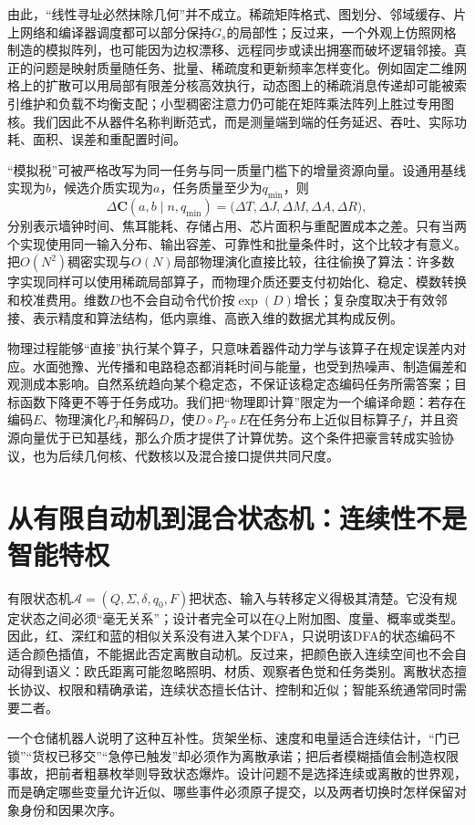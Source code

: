 由此，“线性寻址必然抹除几何”并不成立。稀疏矩阵格式、图划分、邻域缓存、片上网络和编译器调度都可以部分保持$G_s$的局部性；反过来，一个外观上仿照网格制造的模拟阵列，也可能因为边权漂移、远程同步或读出拥塞而破坏逻辑邻接。真正的问题是映射质量随任务、批量、稀疏度和更新频率怎样变化。例如固定二维网格上的扩散可以用局部有限差分核高效执行，动态图上的稀疏消息传递却可能被索引维护和负载不均衡支配；小型稠密注意力仍可能在矩阵乘法阵列上胜过专用图核。我们因此不从器件名称判断范式，而是测量端到端的任务延迟、吞吐、实际功耗、面积、误差和重配置时间。

“模拟税”可被严格改写为同一任务与同一质量门槛下的增量资源向量。设通用基线实现为$b$，候选介质实现为$a$，任务质量至少为$q_{\min}$，则
\[
\Delta\mathbf C(a,b\mid n,q_{\min})=
\bigl(\Delta T,\Delta J,\Delta M,\Delta A,\Delta R\bigr),
\]
分别表示墙钟时间、焦耳能耗、存储占用、芯片面积与重配置成本之差。只有当两个实现使用同一输入分布、输出容差、可靠性和批量条件时，这个比较才有意义。把$O(N^2)$稠密实现与$O(N)$局部物理演化直接比较，往往偷换了算法：许多数字实现同样可以使用稀疏局部算子，而物理介质还要支付初始化、稳定、模数转换和校准费用。维数$D$也不会自动令代价按$\exp(D)$增长；复杂度取决于有效邻接、表示精度和算法结构，低内禀维、高嵌入维的数据尤其构成反例。

物理过程能够“直接”执行某个算子，只意味着器件动力学与该算子在规定误差内对应。水面弛豫、光传播和电路稳态都消耗时间与能量，也受到热噪声、制造偏差和观测成本影响。自然系统趋向某个稳定态，不保证该稳定态编码任务所需答案；目标函数下降更不等于任务成功。我们把“物理即计算”限定为一个编译命题：若存在编码$E$、物理演化$P_T$和解码$D$，使$D\circ P_T\circ E$在任务分布上近似目标算子$f$，并且资源向量优于已知基线，那么介质才提供了计算优势。这个条件把豪言转成实验协议，也为后续几何核、代数核以及混合接口提供共同尺度。

\section{从有限自动机到混合状态机：连续性不是智能特权}
\label{sec:automata_sublimation}

有限状态机$\mathcal A=(Q,\Sigma,\delta,q_0,F)$把状态、输入与转移定义得极其清楚。它没有规定状态之间必须“毫无关系”；设计者完全可以在$Q$上附加图、度量、概率或类型。因此，红、深红和蓝的相似关系没有进入某个DFA，只说明该DFA的状态编码不适合颜色插值，不能据此否定离散自动机。反过来，把颜色嵌入连续空间也不会自动得到语义：欧氏距离可能忽略照明、材质、观察者色觉和任务类别。离散状态擅长协议、权限和精确承诺，连续状态擅长估计、控制和近似；智能系统通常同时需要二者。

一个仓储机器人说明了这种互补性。货架坐标、速度和电量适合连续估计，“门已锁”“货权已移交”“急停已触发”却必须作为离散承诺；把后者模糊插值会制造权限事故，把前者粗暴枚举则导致状态爆炸。设计问题不是选择连续或离散的世界观，而是确定哪些变量允许近似、哪些事件必须原子提交，以及两者切换时怎样保留对象身份和因果次序。

